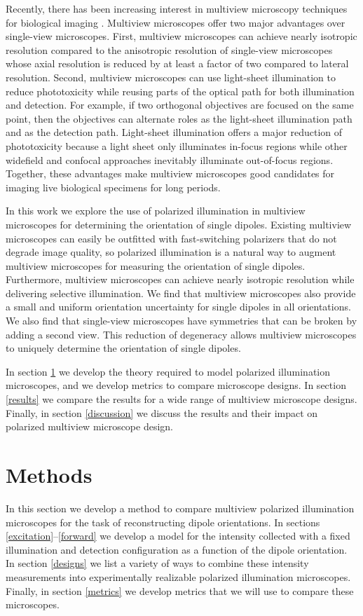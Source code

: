 \documentclass[10pt]{article}
\begin{document}
Recently, there has been increasing interest in multiview microscopy techniques
for biological imaging \cite{wu2013, keller2015, wu2016, wu2017}. Multiview
microscopes offer two major advantages over single-view microscopes. First,
multiview microscopes can achieve nearly isotropic resolution compared to the
anisotropic resolution of single-view microscopes whose axial resolution is
reduced by at least a factor of two compared to lateral resolution. Second,
multiview microscopes can use light-sheet illumination to reduce phototoxicity
while reusing parts of the optical path for both illumination and detection. For
example, if two orthogonal objectives are focused on the same point, then the
objectives can alternate roles as the light-sheet illumination path and as the
detection path. Light-sheet illumination offers a major reduction of
phototoxicity because a light sheet only illuminates in-focus regions while
other widefield and confocal approaches inevitably illuminate out-of-focus
regions. Together, these advantages make multiview microscopes good candidates
for imaging live biological specimens for long periods.

In this work we explore the use of polarized illumination in multiview
microscopes for determining the orientation of single dipoles. Existing
multiview microscopes can easily be outfitted with fast-switching polarizers
that do not degrade image quality, so polarized illumination is a natural way to
augment multiview microscopes for measuring the orientation of single
dipoles. Furthermore, multiview microscopes can achieve nearly isotropic
resolution while delivering selective illumination. We find that multiview
microscopes also provide a small and uniform orientation uncertainty for single
dipoles in all orientations. We also find that single-view microscopes have
symmetries that can be broken by adding a second view. This reduction of
degeneracy allows multiview microscopes to uniquely determine the orientation of
single dipoles.

In section \ref{methods} we develop the theory required to model polarized
illumination microscopes, and we develop metrics to compare microscope
designs. In section \ref{results} we compare the results for a wide range of
multiview microscope designs. Finally, in section \ref{discussion} we discuss
the results and their impact on polarized multiview microscope design.

\section{Methods}\label{methods}
In this section we develop a method to compare multiview polarized illumination
microscopes for the task of reconstructing dipole orientations. In sections
\ref{excitation}--\ref{forward} we develop a model for the intensity collected
with a fixed illumination and detection configuration as a function of the
dipole orientation. In section \ref{designs} we list a variety of ways to
combine these intensity measurements into experimentally realizable polarized
illumination microscopes. Finally, in section \ref{metrics} we develop metrics
that we will use to compare these microscopes.
\end{document}
